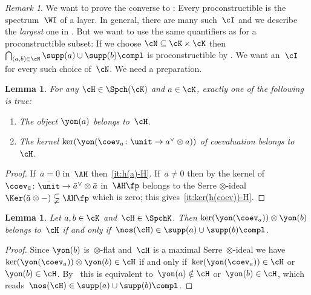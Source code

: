 \documentclass[11pt]{amsart}
\numberwithin{equation}{section} %
\theoremstyle{plain}
\newtheorem{lem}[equation]{Lemma}
\theoremstyle{definition}
\theoremstyle{remark}
\newtheorem{rem}[equation]{Remark}
\begin{document}
\begin{rem}
We want to prove the converse to : Every proconstructible is the spectrum~$\WI$ of a layer. In general, there are many such~$\cI$ and we describe the \emph{largest} one in . But we want to use the same quantifiers as for a proconstructible subset: If we {choose} $\cN\subseteq \cK\times \cK$ then $\bigcap_{(a,b)\in\cN}\supp(a)\cup\supp(b)\compl$ is proconstructible by . We want an~$\cI$ for every such choice of~$\cN$.
We need a preparation.
\end{rem}

%
\begin{lem}
\label{lem:h(a)-or-ker(h(coev))-in-H}
For any $\cH \in \Spch(\cK)$ and $a \in \cK$, exactly one of the following is true:
%
\begin{enumerate}[\rm(i)]
\item
\label{it:h(a)-H}
The object $\yon(a)$ belongs to~$\cH$.
%
\item
\label{it:ker(h(coev))-H}%
The kernel $\ker(\yon(\coev_a\colon \unit\to a^\vee\otimes a))$ of coevaluation belongs to~$\cH$.
\end{enumerate}
%
\end{lem}

\begin{proof}
If~$\bar{a}=0$ in~$\AH$ then~\eqref{it:h(a)-H}. If~$\bar{a}\neq 0$ then by  the kernel of $\coev_{\bar{a}}\colon \bar{\unit}\to \bar{a}^\vee\otimes\bar{a}$ in~$\AH\fp$ belongs to the Serre $\otimes$-ideal~$\Ker(\bar{a}\otimes-)\subsetneqq\AH\fp$ which is zero; this gives~\eqref{it:ker(h(coev))-H}.
\end{proof}

%
\begin{lem}
\label{lem:claim}%
Let $a,b\in\cK$ and~$\cH\in\SpchK$. Then $\ker(\yon(\coev_a)) \otimes \yon(b)$ belongs to~$\cH$ if and only if~$\nos(\cH)\in\supp(a)\cup\supp(b)\compl$.
\end{lem}
\begin{proof}
Since $\yon(b)$ is~$\otimes$-flat and~$\cH$ is a maximal Serre~$\otimes$-ideal we have $\ker(\yon(\coev_a)) \otimes \yon(b)\in\cH$ if and only if~$\ker(\yon(\coev_a))\in\cH$ or~$\yon(b)\in\cH$. By~ this is equivalent to~$\yon(a)\notin\cH$ or~$\yon(b)\in\cH$, which reads~$\nos(\cH)\in\supp(a)\cup\supp(b)\compl$.
\end{proof}
\end{document}
